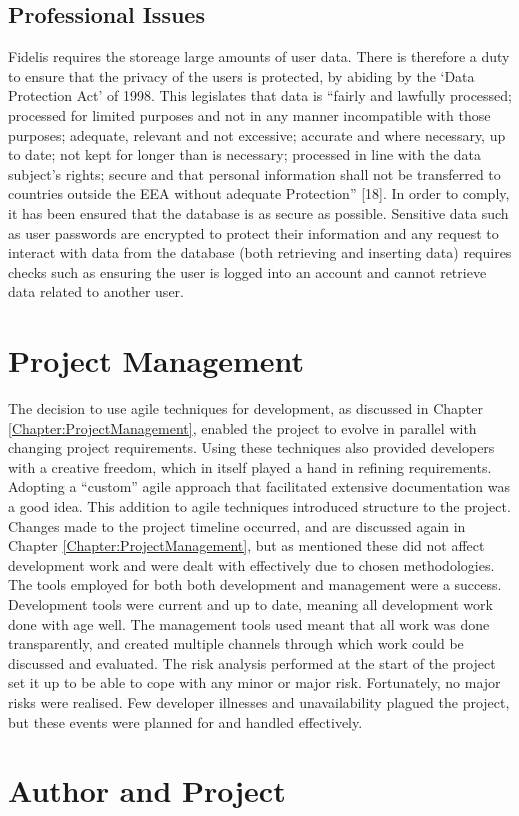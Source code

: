 \subsection{Professional Issues}
Fidelis requires the storeage large amounts of user data. There is therefore a duty to ensure that the privacy of the users is protected, by abiding by the `Data Protection Act' of 1998. This legislates that data is ``fairly and lawfully processed; processed for limited purposes and not in any manner incompatible with those purposes; adequate, relevant and not excessive; accurate and where necessary, up to date; not kept for longer than is necessary; processed in line with the data subject's rights; secure and that personal information shall not be transferred to countries outside the EEA without adequate Protection'' [18]. In order to comply, it has been ensured that the database is as secure as possible. Sensitive data such as user passwords are encrypted to protect their information and any request to interact with data from the database (both retrieving and inserting data) requires checks such as ensuring the user is logged into an account and cannot retrieve data related to another user.

\section{Project Management}
The decision to use agile techniques for development, as discussed in Chapter \ref{Chapter:ProjectManagement}, enabled the project to evolve in parallel with changing project requirements. Using these techniques also provided developers with a creative freedom, which in itself played a hand in refining requirements. Adopting a ``custom'' agile approach that facilitated extensive documentation was a good idea. This addition to agile techniques introduced structure to the project. Changes made to the project timeline occurred, and are discussed again in Chapter \ref{Chapter:ProjectManagement}, but as mentioned these did not affect development work and were dealt with effectively due to chosen methodologies. The tools employed for both both development and management were a success. Development tools were current and up to date, meaning all development work done with age well. The management tools used meant that all work was done transparently, and created multiple channels through which work could be discussed and evaluated. The risk analysis performed at the start of the project set it up to be able to cope with any minor or major risk. Fortunately, no major risks were realised. Few developer illnesses and unavailability plagued the project, but these events were planned for and handled effectively.

\section{Author and Project}